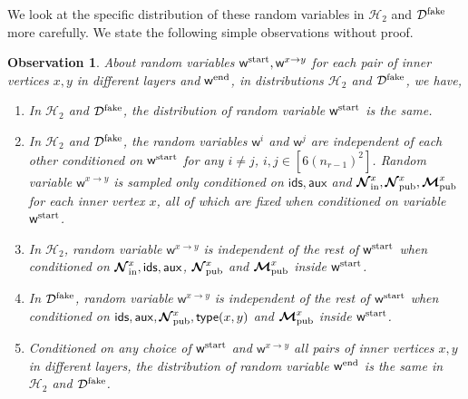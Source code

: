\documentclass[11pt]{article}
\newtheorem{observation}[lemma]{Observation}
\theoremstyle{definition}
\newcommand{\rv}[1]{\ensuremath{{\mathsf{#1}}}\xspace}
\newcommand{\rtypeval}[1]{\ensuremath{\rv{type}(#1)}}
\newcommand{\rNinner}[2]{\ensuremath{\bm{\mathcal{N}}_{\textnormal{in}}^{#1_{#2}}}}
\newcommand{\cH}{\ensuremath{\mathcal{H}}}
\newcommand{\cD}{\ensuremath{\mathcal{D}}}
\newcommand{\cDfake}{\ensuremath{\cD^{\textnormal{fake}}}}
\newcommand{\raux}{\ensuremath{\rv{aux}}}
\newcommand{\rNpub}[1]{\ensuremath{\bm{\mathcal{N}}_{\textnormal{pub}}^{#1}}}
\newcommand{\rMpub}[1]{\ensuremath{\bm{\mathcal{M}}_{\textnormal{pub}}^{#1}}}
\newcommand{\rids}{\ensuremath{\rv{ids}}}
\newcommand{\rw}{\rv{w}}
\newcommand{\rwstart}{\rv{w}^{\textnormal{start}}}
\newcommand{\rwend}{\rv{w}^{\textnormal{end}}}
\begin{document}
We look at the specific distribution of these random variables in $\cH_2$ and $\cDfake$ more carefully. 
We state the following simple observations without proof.
\begin{observation}\label{obs:inter-H2fake-list}
	About random variables $\rwstart, \rw^{x \to y}$ for each pair of inner vertices $x, y$ in different layers and $\rwend$, in distributions $\cH_2$ and $\cDfake$, we have, 
	\begin{enumerate}[label=$(\roman*)$]
		\item \label{item:wstart-same-H2fake} In $\cH_2$ and $\cDfake$, the distribution of random variable $\rwstart$ is the same. 
		\item \label{item:wxy-indep-H2fake} In $\cH_2$ and $\cDfake$, the random variables $\rw^{i}$ and $\rw^{j}$ are independent of each other conditioned on $\rwstart$ for any $i \neq j$, $i,j \in [6(n_{r-1})^2]$. Random variable $\rw^{x \to y}$ is sampled only conditioned on $\rids, \raux$ and $\rNinner{x}{}, \rNpub{x}, \rMpub{x}$ for each inner vertex $x$, all of which are fixed when conditioned on variable $\rwstart$. 
		\item \label{item:wxy-indep-H2} In $\cH_2$, random variable $\rw^{x \to y}$ is independent of the rest of $\rwstart$ when conditioned on $\rNinner{x}{} , \rids, \raux$, $\rNpub{x}$ and $\rMpub{x}$ inside $\rwstart$. 
		\item \label{item:wxy-indep-fake} In $\cDfake$, random variable $\rw^{x \to y}$ is independent of the rest of $\rwstart$ when conditioned on $\rids, \raux, \rNpub{x}, \rtypeval{x, y}$ and $\rMpub{x}$ inside $\rwstart$.
		\item \label{item:wend-indep-H2fake} Conditioned on any choice of $\rwstart$ and $\rw^{x \to y}$ all pairs of inner vertices $x, y$ in different layers, the distribution of random variable $\rwend$ is the same in $\cH_2$ and $\cDfake$. 
	\end{enumerate}
\end{observation}
\end{document}

